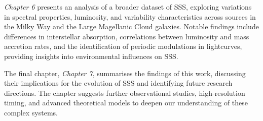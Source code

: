     \textit{Chapter 6} presents an analysis of a broader dataset of SSS, exploring variations in spectral properties, luminosity, and variability characteristics across sources in the Milky Way and the Large Magellanic Cloud galaxies. Notable findings include differences in interstellar absorption, correlations between luminosity and mass accretion rates, and the identification of periodic modulations in lightcurves, providing insights into environmental influences on SSS.
    
    The final chapter, \textit{Chapter 7}, summarises the findings of this work, discussing their implications for the evolution of SSS and identifying future research directions. The chapter suggests further observational studies, high-resolution timing, and advanced theoretical models to deepen our understanding of these complex systems.